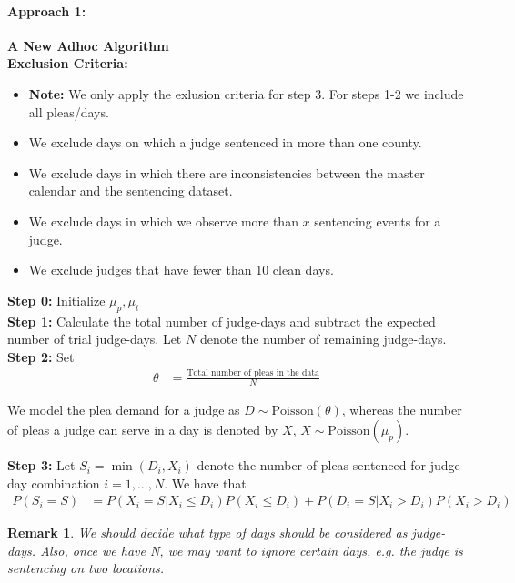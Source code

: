 \documentclass[11pt, oneside]{article}   	%
\theoremstyle{ModifiedStyle}
\newtheorem{remark}{Remark}
\begin{document}
			\paragraph{Approach 1:} \textbf{A New Adhoc Algorithm} \\
			\textbf{Exclusion Criteria:}
			\begin{itemize}
				\item \textbf{Note:} We only apply the exlusion criteria for step 3. For steps 1-2 we include all pleas/days.
				\item We exclude days on which a judge sentenced in more than one county.
				\item We exclude days in which there are inconsistencies between the master calendar
				and the sentencing dataset.
				\item We exclude days in which we observe more than $x$ sentencing events for a judge.
				\item We exclude judges that have fewer than 10 clean days.
			\end{itemize}
			\textbf{Step 0:} Initialize $\mu_p,\mu_t$\\
			\textbf{Step 1:} Calculate the total number of judge-days and subtract the expected number of trial judge-days. Let $N$ denote the number of remaining judge-days.\\
			\textbf{Step 2:} Set
			\begin{align*}
				\theta &= \frac{\text{Total number of pleas in the data}}{N}
			\end{align*}

			We model the plea demand for a judge as $D \sim \text{Poisson}(\theta)$, whereas the number of pleas a judge can serve in a day is denoted by $X$, $X \sim \text{Poisson}(\mu_p)$.

			\noindent \textbf{Step 3:} Let $S_i = \min(D_i,X_i)$ denote the number of pleas sentenced for judge-day combination $i=1,...,N$. We have that
			\begin{align*}
				P(S_i = S) &= P(X_i = S | X_i \leq D_i) P(X_i \leq D_i) + P(D_i = S | X_i > D_i) P(X_i > D_i)
			\end{align*}

			\begin{remark}
				We should decide what type of days should be considered as judge-days. Also, once we have N, we may want to ignore certain days, e.g. the judge is sentencing on two locations.
			\end{remark} \\
\end{document}
